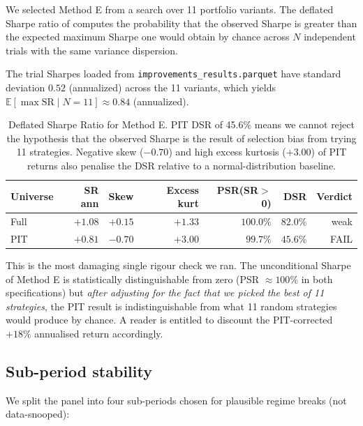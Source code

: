 \documentclass[11pt]{article}
\begin{document}
We selected Method E from a search over 11 portfolio variants. The deflated
Sharpe ratio of \citet{bailey2014} computes the probability that the
observed Sharpe is greater than the expected maximum Sharpe one would obtain
by chance across $N$ independent trials with the same variance dispersion.

The trial Sharpes loaded from \texttt{improvements\_results.parquet} have
standard deviation $0.52$ (annualized) across the 11 variants, which yields
$\mathbb{E}[\max \text{SR} \mid N=11] \approx 0.84$ (annualized).

\begin{table}[h]
\centering
\begin{tabular}{lrrrrrr}
\toprule
Universe & SR ann & Skew & Excess kurt & PSR(SR$>$0) & DSR & Verdict \\
\midrule
Full     & $+1.08$ & $+0.15$ & $+1.33$ & $100.0\%$ & $\mathbf{82.0\%}$ & weak \\
PIT      & $+0.81$ & $-0.70$ & $+3.00$ & $99.7\%$  & $\mathbf{45.6\%}$ & FAIL \\
\bottomrule
\end{tabular}
\caption{Deflated Sharpe Ratio for Method E. PIT DSR of 45.6\% means we
  cannot reject the hypothesis that the observed Sharpe is the result of
  selection bias from trying 11 strategies. Negative skew ($-0.70$) and high
  excess kurtosis ($+3.00$) of PIT returns also penalise the DSR relative
  to a normal-distribution baseline.}
\label{tab:dsr}
\end{table}

This is the most damaging single rigour check we ran. The unconditional
Sharpe of Method E is statistically distinguishable from zero (PSR
$\approx 100\%$ in both specifications) but \emph{after adjusting for the
fact that we picked the best of 11 strategies}, the PIT result is
indistinguishable from what 11 random strategies would produce by chance.
A reader is entitled to discount the PIT-corrected $+18\%$ annualised
return accordingly.

\subsection{Sub-period stability}

We split the panel into four sub-periods chosen for plausible regime breaks
(not data-snooped):
\end{document}
